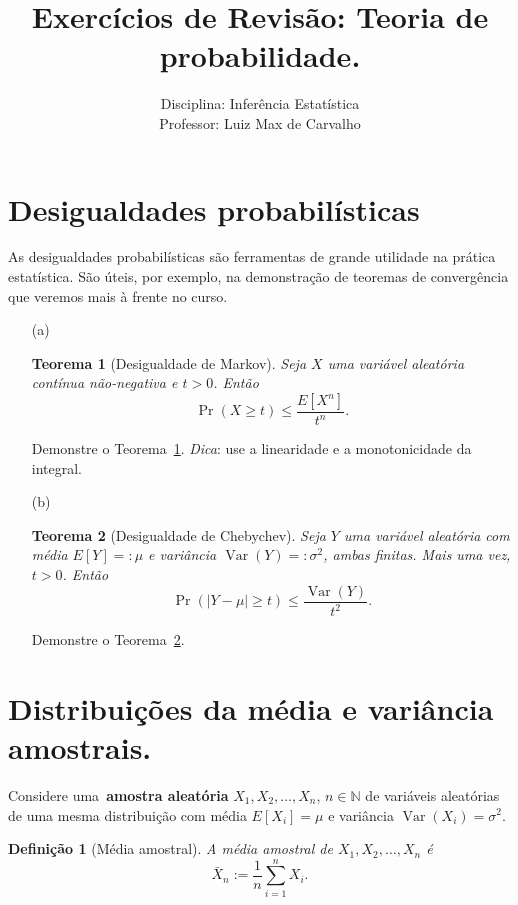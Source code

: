 \documentclass[a4paper,12pt, notitlepage]{paper}
\title{Exercícios de Revisão: Teoria de probabilidade.}
\author{Disciplina: Inferência Estatística \\ Professor: Luiz Max de Carvalho}
\newtheorem{theo}{Teorema}
\newtheorem{defn}{Definição}
\newcommand{\pr}{\operatorname{Pr}} %
\newcommand{\vr}{\operatorname{Var}} %
\newcommand{\rs}{X_1, X_2, \ldots, X_n} %
\begin{document}
\maketitle

\section{Desigualdades probabilísticas}

As desigualdades probabilísticas são ferramentas de grande utilidade na prática estatística.
São úteis, por exemplo, na demonstração de teoremas de convergência que veremos mais à frente no curso.

\begin{itemize}
 \item[(a)]
 \begin{theo}[Desigualdade de Markov]
 \label{thm:Markov_ineq}
 Seja $X$ uma variável aleatória contínua não-negativa e $t > 0$.
Então
\begin{equation}
 \label{eq:Markov_ineq}
 \pr(X \geq t) \leq \frac{E[X^n]}{t^n}.
\end{equation}
\end{theo}
Demonstre o Teorema~\ref{thm:Markov_ineq}.
\textit{Dica}: use a linearidade e a monotonicidade da integral.
 \item[(b)]
 \begin{theo}[Desigualdade de Chebychev]
 \label{thm:Chebychev_ineq}
 Seja $Y$ uma variável aleatória com média $E[Y] =: \mu$ e variância $\vr(Y) =: \sigma^2$, ambas finitas.
Mais uma vez, $t>0$.
Então
\begin{equation}
 \label{eq:Chebychev_ineq}
 \pr(|Y-\mu| \geq t) \leq \frac{\vr(Y)}{t^2}.
\end{equation}
\end{theo}
Demonstre o Teorema~\ref{thm:Chebychev_ineq}.
 \end{itemize}
 
\section{Distribuições da média e variância amostrais.}

Considere uma~\textbf{amostra aleatória} $\rs$, $n \in \mathbb{N}$ de variáveis aleatórias de uma mesma distribuição com média $E[X_i] = \mu$ e variância $\vr(X_i) = \sigma^2$.

\begin{defn}[Média amostral]
 A média amostral de $\rs$ é
 \begin{equation}
  \label{eq:sample_mean}
  \bar{X}_n := \frac{1}{n} \sum_{i = 1}^n X_i.
 \end{equation}
\end{defn}
\end{document}
